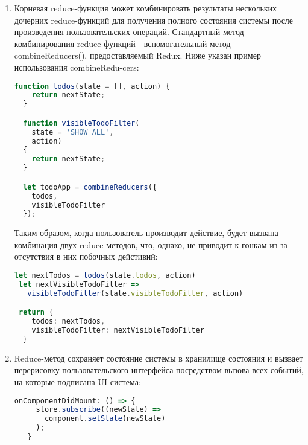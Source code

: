 \begin{enumerate}[label=\arabic*.]
\item
  Корневая reduce-функция может комбинировать результаты нескольких дочерних reduce-функций для получения полного состояния системы после произведения пользовательских операций.
  Стандартный метод комбинирования reduce-функций - вспомогательный метод combineReducers(), предоставляемый Redux. Ниже указан пример использования combineRedu-cers:

  \begin{lstlisting}[language=TypeScript, label=lst:domain:redux3] 
  function todos(state = [], action) {
    return nextState;
  }

  function visibleTodoFilter(
    state = 'SHOW_ALL',
    action)
  {
    return nextState;
  }

  let todoApp = combineReducers({
    todos,
    visibleTodoFilter
  });

 \end{lstlisting}

 Таким образом, когда пользователь производит действие, будет вызвана комбинация двух reduce-методов, что,
 однако, не приводит к гонкам из-за отсутствия в них побочных дейстивий:
 
 \begin{lstlisting}[language=TypeScript, label=lst:domain:redux4]
 let nextTodos = todos(state.todos, action)
 let nextVisibleTodoFilter =>
   visibleTodoFilter(state.visibleTodoFilter, action)

 return {
    todos: nextTodos,
    visibleTodoFilter: nextVisibleTodoFilter
  }
 \end{lstlisting}

\item
 Reduce-метод сохраняет состояние системы в хранилище состояния и вызвает перерисовку пользовательского интерфейса посредством вызова всех событий, на которые подписана UI система:

 \begin{lstlisting}[language=TypeScript, label=lst:domain:redux5]
   onComponentDidMount: () => {
     store.subscribe((newState) =>
       component.setState(newState)
     );
   } 
 \end{lstlisting}

\end{enumerate}